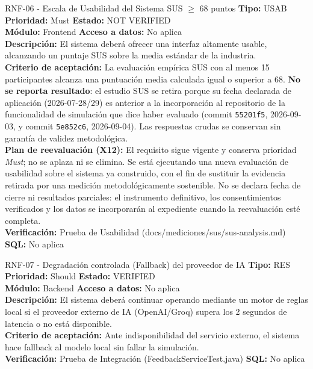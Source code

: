 \documentclass[11pt,a4paper]{article}
\begin{document}
\begin{requisito}{RNF-06 - Escala de Usabilidad del Sistema SUS $\ge$ 68 puntos}
    \textbf{Tipo:} USAB \quad \textbf{Prioridad:} Must \quad \textbf{Estado:} NOT VERIFIED \\[0.2cm]
    \textbf{Módulo:} Frontend \quad \textbf{Acceso a datos:} No aplica \\[0.2cm]
    \textbf{Descripción:} El sistema deberá ofrecer una interfaz altamente usable, alcanzando un puntaje SUS sobre la media estándar de la industria. \\[0.2cm]
    \textbf{Criterio de aceptación:} La evaluación empírica SUS con al menos 15 participantes alcanza una puntuación media calculada igual o superior a 68. \textbf{No se reporta resultado}: el estudio SUS se retira porque su fecha declarada de aplicación (2026-07-28/29) es anterior a la incorporación al repositorio de la funcionalidad de simulación que dice haber evaluado (commit \texttt{55201f5}, 2026-09-03, y commit \texttt{5e852c6}, 2026-09-04). Las respuestas crudas se conservan sin garantía de validez metodológica. \\[0.2cm]
    \textbf{Plan de reevaluación (X12):} El requisito sigue vigente y conserva prioridad \textit{Must}; no se aplaza ni se elimina. Se está ejecutando una nueva evaluación de usabilidad sobre el sistema ya construido, con el fin de sustituir la evidencia retirada por una medición metodológicamente sostenible. No se declara fecha de cierre ni resultados parciales: el instrumento definitivo, los consentimientos verificados y los datos se incorporarán al expediente cuando la reevaluación esté completa. \\[0.2cm]
    \textbf{Verificación:} Prueba de Usabilidad (docs/mediciones/sus/sus-analysis.md) \quad \textbf{SQL:} No aplica
\end{requisito}

\begin{requisito}{RNF-07 - Degradación controlada (Fallback) del proveedor de IA}
    \textbf{Tipo:} RES \quad \textbf{Prioridad:} Should \quad \textbf{Estado:} VERIFIED \\[0.2cm]
    \textbf{Módulo:} Backend \quad \textbf{Acceso a datos:} No aplica \\[0.2cm]
    \textbf{Descripción:} El sistema deberá continuar operando mediante un motor de reglas local si el proveedor externo de IA (OpenAI/Groq) supera los 2 segundos de latencia o no está disponible. \\[0.2cm]
    \textbf{Criterio de aceptación:} Ante indisponibilidad del servicio externo, el sistema hace fallback al modelo local sin fallar la simulación. \\[0.2cm]
    \textbf{Verificación:} Prueba de Integración (FeedbackServiceTest.java) \quad \textbf{SQL:} No aplica
\end{requisito}
\end{document}
